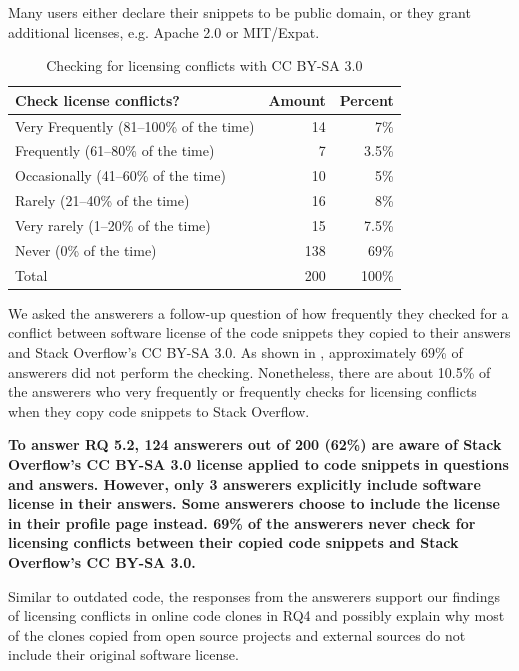 \documentclass[10pt,journal,compsoc]{IEEEtran}
\begin{document}
Many users either declare their snippets to be public domain, or they grant
additional licenses, e.g. Apache 2.0 or MIT/Expat.

\begin{table}
	\centering
	\caption{Checking for licensing conflicts with CC BY-SA 3.0}
	\label{tab:survey_license_check}
	\begin{tabular}{lrr}
		\toprule
		Check license conflicts? & Amount & Percent \\
		\midrule
		Very Frequently (81--100\% of the time)	& 14 & 7\% \\
		Frequently (61--80\% of the time) & 7 & 3.5\% \\
		Occasionally (41--60\% of the time) & 10 & 5\% \\
		Rarely (21--40\% of the time) & 16 & 8\% \\
		Very rarely (1--20\% of the time) & 15 & 7.5\% \\
		Never (0\% of the time) & 138 & 69\% \\
		\midrule
		Total & 200 & 100\% \\
		\bottomrule
	\end{tabular}
\end{table}

We asked the answerers a follow-up question of how frequently they checked for a
conflict between software license of the code snippets they copied to their
answers and Stack Overflow's CC BY-SA 3.0. As shown in
, approximately 69\% of answerers did not perform
the checking. Nonetheless, there are about 10.5\% of the answerers who very
frequently or frequently checks for licensing conflicts when they copy code
snippets to Stack Overflow.

\textbf{To answer RQ 5.2, 124 answerers out of 200 (62\%) are aware of Stack Overflow's
CC BY-SA 3.0 license applied to code snippets in questions and answers. However,
only 3 answerers explicitly include software license in their answers. Some 
answerers choose to include the license in their profile page instead. 69\% of the
answerers never check for licensing conflicts between their copied code snippets
and Stack Overflow's CC BY-SA 3.0.}

Similar to outdated code, the responses from the answerers support our findings
of licensing conflicts in online code clones in RQ4 and possibly explain why most of
the clones copied from open source projects and external sources do not include
their original software license.
\end{document}

